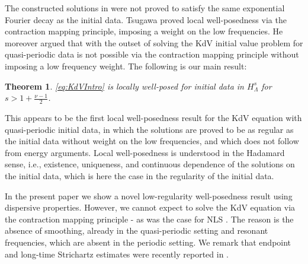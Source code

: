 \documentclass{amsart}
\newtheorem{theorem}{Theorem}[section]
\theoremstyle{definition}
\begin{document}
 The constructed solutions in \cite{BinderDamanikGoldsteinLukic2018} were not proved to satisfy the same exponential Fourier decay as the initial data. Tsugawa \cite{Tsugawa2012} proved local well-posedness via the contraction mapping principle, imposing a weight on the low frequencies. He moreover argued \cite[Proposition~5.1,~Remark~5.2]{Tsugawa2012} that with the outset of \cite{Tsugawa2012} solving the KdV initial value problem for quasi-periodic data is not possible via the contraction mapping principle without imposing a low frequency weight. 
The following is our main result:
\begin{theorem}
\eqref{eq:KdVIntro} is locally well-posed for initial data in $H^{s}_{\Lambda}$ for $s>1+\frac{\nu-1}{2} $.
\end{theorem} 
This appears to be the first local well-posedness result for the KdV equation with quasi-periodic initial data, in which the solutions are proved to be as regular as the initial data without weight on the low frequencies, and which does not follow from energy arguments. Local well-posedness is understood in the Hadamard sense, i.e., existence, uniqueness, and continuous dependence of the solutions on the initial data, which is here the case in the regularity of the initial data.

\smallskip

In the present paper we show a novel low-regularity well-posedness result using dispersive properties. However, we cannot expect to solve the KdV equation via the contraction mapping principle - as was the case for NLS \cite{Schippa2025Quasiperiodic}. 
The reason is the absence of smoothing, already in the quasi-periodic setting and resonant frequencies, which are absent in the periodic setting. We remark that endpoint and long-time Strichartz estimates were recently reported in \cite{Inami2026}.
\end{document}
